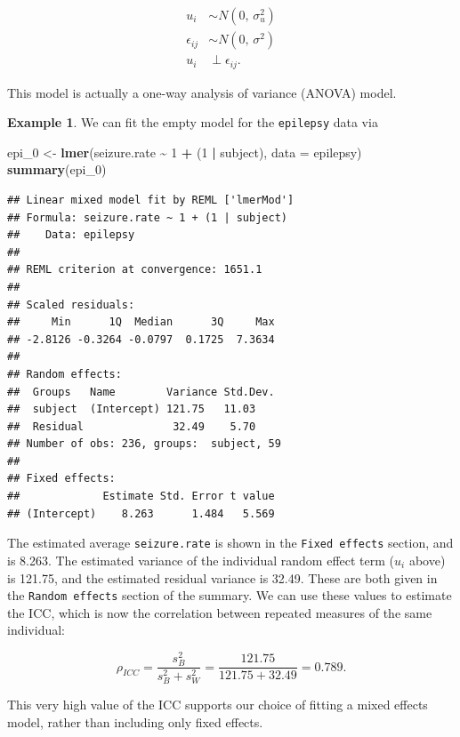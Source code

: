 \documentclass[
  openany]{book}
\newenvironment{Shaded}{\begin{snugshade}}{\end{snugshade}}
\newcommand{\AttributeTok}[1]{\textcolor[rgb]{0.13,0.29,0.53}{#1}}
\newcommand{\DecValTok}[1]{\textcolor[rgb]{0.00,0.00,0.81}{#1}}
\newcommand{\FunctionTok}[1]{\textcolor[rgb]{0.13,0.29,0.53}{\textbf{#1}}}
\newcommand{\NormalTok}[1]{#1}
\newcommand{\OtherTok}[1]{\textcolor[rgb]{0.56,0.35,0.01}{#1}}
\newcommand{\SpecialCharTok}[1]{\textcolor[rgb]{0.81,0.36,0.00}{\textbf{#1}}}
\theoremstyle{definition}
\theoremstyle{definition}
\newtheorem{example}{Example}[chapter]
\theoremstyle{definition}
\theoremstyle{definition}
\theoremstyle{remark}
\begin{document}
\begin{align*}
u_{i} & \sim N\left(0,\,\sigma^2_{u}\right)\\
\epsilon_{ij}& \sim N\left(0,\,\sigma^2\right)\\
u_i&\perp \epsilon_{ij}.
\end{align*}

This model is actually a one-way analysis of variance (ANOVA) model.

\begin{example}
We can fit the empty model for the \texttt{epilepsy} data via

\begin{Shaded}
\begin{Highlighting}[]
\NormalTok{epi\_0 }\OtherTok{\textless{}{-}} \FunctionTok{lmer}\NormalTok{(seizure.rate }\SpecialCharTok{\textasciitilde{}} \DecValTok{1} \SpecialCharTok{+}\NormalTok{ (}\DecValTok{1} \SpecialCharTok{|}\NormalTok{ subject), }\AttributeTok{data =}\NormalTok{ epilepsy)}
\FunctionTok{summary}\NormalTok{(epi\_0)}
\end{Highlighting}
\end{Shaded}

\begin{verbatim}
## Linear mixed model fit by REML ['lmerMod']
## Formula: seizure.rate ~ 1 + (1 | subject)
##    Data: epilepsy
## 
## REML criterion at convergence: 1651.1
## 
## Scaled residuals: 
##     Min      1Q  Median      3Q     Max 
## -2.8126 -0.3264 -0.0797  0.1725  7.3634 
## 
## Random effects:
##  Groups   Name        Variance Std.Dev.
##  subject  (Intercept) 121.75   11.03   
##  Residual              32.49    5.70   
## Number of obs: 236, groups:  subject, 59
## 
## Fixed effects:
##             Estimate Std. Error t value
## (Intercept)    8.263      1.484   5.569
\end{verbatim}

The estimated average \texttt{seizure.rate} is shown in the \texttt{Fixed\ effects} section, and is 8.263. The estimated variance of the individual random effect term (\(u_i\) above) is 121.75, and the estimated residual variance is 32.49. These are both given in the \texttt{Random\ effects} section of the summary. We can use these values to estimate the ICC, which is now the correlation between repeated measures of the same individual:

\[\rho_{ICC} = \frac{s^2_B}{s^2_B + s^2_W} = \frac{121.75}{121.75+32.49} = 0.789.\]

This very high value of the ICC supports our choice of fitting a mixed effects model, rather than including only fixed effects.
\end{example}
\end{document}
